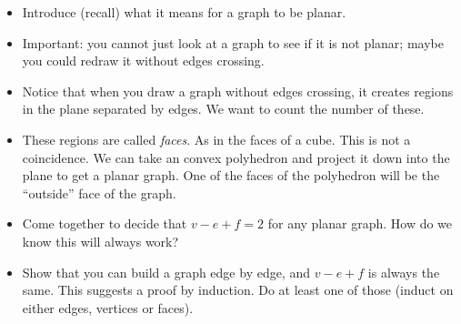 \documentclass[12pt]{article}
\theoremstyle{plain}
\theoremstyle{definition}
\theoremstyle{remark}
\newcommand{\todayis}[1]{\clearpage{\rhead{\footnotesize #1}}}
\begin{document}
\begin{itemize}
  \item Introduce (recall) what it means for a graph to be planar.
  \item Important: you cannot just look at a graph to see if it is not planar; maybe you could redraw it without edges crossing.
  \item Notice that when you draw a graph without edges crossing, it creates regions in the plane separated by edges.  We want to count the number of these.
  \item These regions are called {\em faces}. As in the faces of a cube. This is not a coincidence.  We can take an convex polyhedron and project it down into the plane to get a planar graph.  One of the faces of the polyhedron will be the ``outside'' face of the graph.
  \item Come together to decide that $v - e + f = 2$ for any planar graph.  How do we know this will always work?
  \item Show that you can build a graph edge by edge, and $v - e + f$ is always the same.  This suggests a proof by induction.  Do at least one of those (induct on either edges, vertices or faces).

\end{itemize}



\todayis{Monday, September 17}
\end{document}
